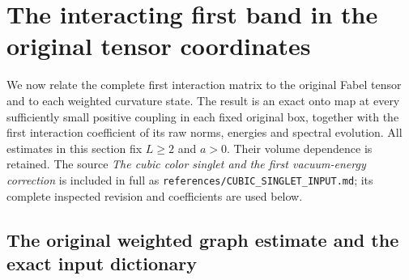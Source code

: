 \documentclass[11pt]{article}
\begin{document}
\section{The interacting first band in the original tensor coordinates}
\label{sec:interacting-tensor-band}

We now relate the complete first interaction matrix to the original
Fabel tensor and to each weighted curvature state. The result is an
exact onto map at every sufficiently small positive coupling in each
fixed original box, together with the first interaction coefficient of
its raw norms, energies and spectral evolution. All estimates in this
section fix $L\ge2$ and $a>0$. Their volume dependence is retained.
The source \emph{The cubic color singlet and the first vacuum-energy
correction} is included in full as
\texttt{references/CUBIC\_SINGLET\_INPUT.md}; its complete inspected
revision and coefficients are used below.

\subsection{The original weighted graph estimate and the exact input dictionary}
\end{document}
